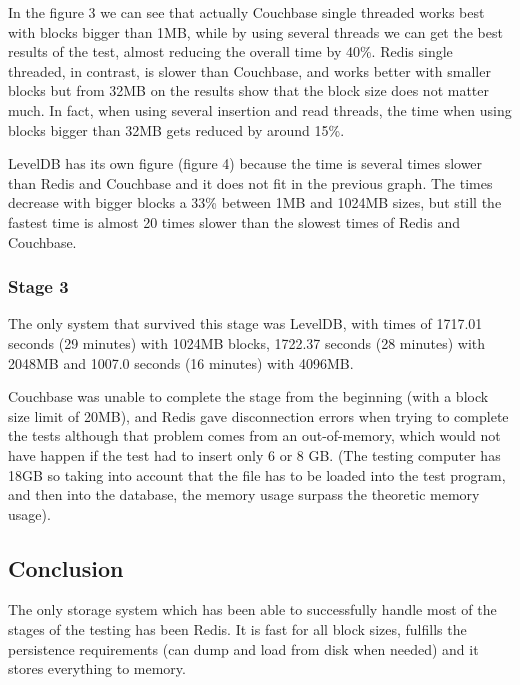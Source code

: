 \documentclass[12pt]{article}
\begin{document}
In the figure 3 we can see that actually Couchbase single threaded works best with blocks bigger than 1MB, while by using several threads we can get the best results of the test, almost reducing the overall time by 40\%. Redis single threaded, in contrast, is slower than Couchbase, and works better with smaller blocks but from 32MB on the results show that the block size does not matter much. In fact, when using several insertion and read threads, the time when using blocks bigger than 32MB gets reduced by around 15\%.

LevelDB has its own figure (figure 4) because the time is several times slower than Redis and Couchbase and it does not fit in the previous graph. The times decrease with bigger blocks a 33\% between 1MB and 1024MB sizes, but still the fastest time is almost 20 times slower than the slowest times of Redis and Couchbase.

\subsubsection{Stage 3}
The only system that survived this stage was LevelDB, with times of 1717.01 seconds (29 minutes) with 1024MB blocks, 1722.37 seconds (28 minutes) with 2048MB and 1007.0 seconds (16 minutes) with 4096MB.

Couchbase was unable to complete the stage from the beginning (with a block size limit of 20MB), and Redis gave disconnection errors when trying to complete the tests although that problem comes from an out-of-memory, which would not have happen if the test had to insert only 6 or 8 GB. (The testing computer has 18GB so taking into account that the file has to be loaded into the test program, and then into the database, the memory usage surpass the theoretic memory usage).

\subsection{Conclusion}
The only storage system which has been able to successfully handle most of the stages of the testing has been Redis. It is fast for all block sizes, fulfills the persistence requirements (can dump and load from disk when needed) and it stores everything to memory.
\end{document}
